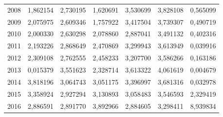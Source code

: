 \begin{table}
\begin{tabular}{p{1cm}p{2cm}p{2cm}p{2cm}p{2cm}p{2cm}p{2cm}}
 2008 &      1,862154 &                                          2,730195 &                              1,620691 &                                      3,530699 &                         3,828108 &                        0,565099 \\
 2009 &      2,075975 &                                          2,609346 &                              1,757922 &                                      3,417504 &                         3,739307 &                        0,490719 \\
 2010 &      2,000330 &                                          2,630298 &                              2,078860 &                                      2,887041 &                         3,491132 &                        0,402316 \\
 2011 &      2,193226 &                                          2,868649 &                              2,470869 &                                      3,299943 &                         3,613949 &                        0,039916 \\
 2012 &      2,309108 &                                          2,762555 &                              2,458233 &                                      3,207700 &                         3,586266 &                        0,163186 \\
 2013 &      0,015379 &                                          3,551623 &                              2,328714 &                                      3,613322 &                         4,061619 &                        0,004679 \\
 2014 &      3,818196 &                                          3,064743 &                              3,051175 &                                      3,396997 &                         3,681316 &                        0,032978 \\
 2015 &      3,358924 &                                          2,927294 &                              3,130893 &                                      3,058483 &                         3,546593 &                        2,329419 \\
 2016 &      2,886591 &                                          2,891770 &                              3,892966 &                                      2,884605 &                         3,298411 &                        8,939834 \\
\bottomrule
\end{tabular}
\end{table}
